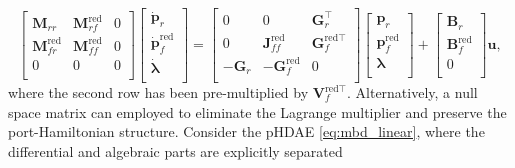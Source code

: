 \documentclass{svjour3}                     %
\begin{document}
\begin{equation}
\begin{bmatrix}
\mathbf{M}_{rr} & \mathbf{M}_{rf}^{\text{red}} & 0 \\ 
\mathbf{M}_{fr}^{\text{red}} & \mathbf{M}_{ff}^{\text{red}} & 0 \\
0 & 0 & 0 \\
\end{bmatrix}
\begin{bmatrix}
\dot{\mathbf{p}}_r \\ \dot{\mathbf{p}}_f^{\text{red}} \\ \dot{\mathbf{\lambda}} \\ 
\end{bmatrix} = 
\begin{bmatrix}
0 & 0 & \mathbf{G}_r^\top \\ 
0 & \mathbf{J}_{ff}^{\text{red}} & \mathbf{G}_f^{\text{red} \top} \\ 
-\mathbf{G}_r & -\mathbf{G}_f^{\text{red}} & 0 \\
\end{bmatrix}
\begin{bmatrix}
\mathbf{p}_r \\ \mathbf{p}_f^{\text{red}} \\ {\mathbf{\lambda}} \\ 
\end{bmatrix} + 
\begin{bmatrix}
\mathbf{B}_r \\ \mathbf{B}_f^{\text{red}} \\ 0 \\
\end{bmatrix}\mathbf{u},
\end{equation}
where the second row has been pre-multiplied by $\mathbf{V}_f^{\text{red} \top}$. Alternatively, a null space matrix can employed to eliminate the Lagrange multiplier and preserve the port-Hamiltonian structure. Consider the pHDAE \eqref{eq:mbd_linear}, where the differential and algebraic parts are explicitly separated
\end{document}
